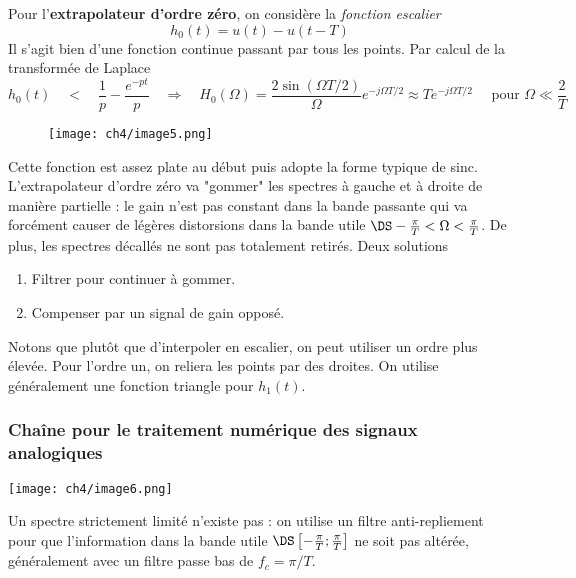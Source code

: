 		Pour l'\textbf{extrapolateur d'ordre zéro}, on considère la \textit{fonction escalier}
		\begin{equation}
		h_0(t) = u(t)-u(t-T)
		\end{equation}
		Il s'agit bien d'une fonction continue passant par tous les points. Par calcul de la 
		transformée de Laplace
		\begin{equation}
		h_0(t)\quad\lt\quad \frac{1}{p}-\frac{e^{-pt}}{p}\quad\Longrightarrow\quad
		H_0(\Omega) = \frac{2\sin(\Omega T/2)}{\Omega}e^{-j\Omega T/2}\approx Te^{-j\Omega T/2}\quad 
		\text{ pour }\Omega \ll \frac{2}{T}
		\end{equation}
		
			\begin{wrapfigure}[10]{l}{7cm}
	\texttt{[image: ch4/image5.png]}
	\end{wrapfigure}	
		Cette fonction est assez plate au début puis adopte la forme typique de sinc.
		L'extrapolateur d'ordre zéro va "gommer" les spectres à gauche et à droite de manière 
		partielle : le gain n'est pas constant dans la bande passante qui va forcément causer de 
		légères distorsions dans la bande utile $\DS -\frac{\pi}{T}<\Omega<\frac{\pi}{T}$. De plus, 
		les spectres décallés ne sont pas totalement retirés. Deux solutions 
		\begin{enumerate}
		\item Filtrer pour continuer à gommer.
		\item Compenser par un signal de gain opposé.
		\end{enumerate}
		
	Notons que plutôt que d'interpoler en escalier, on peut utiliser un ordre plus élevée. Pour 
	l'ordre un, on reliera les points par des droites. On utilise généralement une fonction 
	triangle pour $h_1(t)$.
	
	\subsubsection{Chaîne pour le traitement numérique des signaux analogiques}
	\begin{center}
		\texttt{[image: ch4/image6.png]}
	\end{center}
	Un spectre strictement limité n'existe pas : on utilise un filtre anti-repliement pour 
	que l'information dans la bande utile $\DS \left[-\frac{\pi}{T};\frac{\pi}{T}\right]$ ne 
	soit pas altérée, généralement avec un filtre passe bas de $f_c = \pi/T$.\\
	

